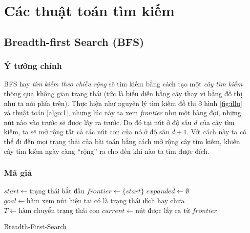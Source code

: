 \chapter{Các thuật toán tìm kiếm}

\section{Breadth-first Search (BFS)}

\subsection{Ý tưởng chính}

BFS hay \textit{tìm kiếm theo chiều rộng} sẽ tìm kiếm bằng cách tạo một \textit{cây tìm kiếm} thông qua không gian trạng thái (tức là biểu diễn bằng cây thay vì bằng đồ thị như ta nói phía trên). Thực hiện như nguyên lý tìm kiếm đồ thị ở hình \ref{fig:illu} và thuật toán \ref{algo:1}, nhưng lúc này ta xem \textit{frontier} như một hàng đợi, những nút nào vào trước sẽ được lấy ra trước. Do đó tại nút ở độ sâu $d$ của cây tìm kiếm, ta sẽ mở rộng tất cả các nút con của nó ở độ sâu $d+1$. Với cách này ta có thể đi đến mọi trạng thái của bài toán bằng cách mở rộng cây tìm kiếm, khiến cây tìm kiếm ngày càng ``rộng'' ra cho đến khi nào ta tìm được đích.

\subsection{Mã giả}

\begin{algorithm}[H]
  $start \gets \text{trạng thái bắt đầu}$\;
  $frontier \gets \{start\}$\; 
  $expanded \gets \emptyset$\;
  $goal \gets \text{hàm xem nút hiện tại có là trạng thái đích hay chưa}$\;
  $T \gets \text{hàm chuyển trạng thái con}$\;
  {
      $current \gets \text{nút được lấy ra từ $frontier$}$\;
      \;
      {
        \;
      }{
        {
            {
                \;
            }
        }
      }
  }
  \;
  \caption{Breadth-First-Search}
  \label{algo:BFS}
\end{algorithm}

